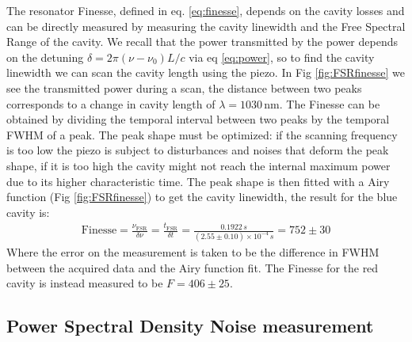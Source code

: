 The resonator Finesse, defined in eq. \ref{eq:finesse}, depends on the cavity losses and can be directly measured by measuring the cavity linewidth and the Free Spectral Range of the cavity. We recall that the power transmitted by the power depends on the detuning $\delta = 2\pi (\nu-\nu_0)L/c$ via eq \ref{eq:power}, so to find the cavity linewidth we can scan the cavity length using the piezo. In Fig \ref{fig:FSRfinesse} we see the transmitted power during a scan, the distance between two peaks corresponds to a change in cavity length of $\lambda = 1030$\,nm. The Finesse can be obtained by dividing the temporal interval between two peaks by the temporal FWHM of a peak. The peak shape must be optimized: if the scanning frequency is too low the piezo is subject to disturbances and noises that deform the peak shape, if it is too high the cavity might not reach the internal maximum power due to its higher characteristic time. The peak shape is then fitted with a Airy function (Fig \ref{fig:FSRfinesse}) to get the cavity linewidth, the result for the blue cavity is:
\begin{align}
	\mathrm{Finesse} = \frac{\nu_{\mathrm{FSR}}}{\delta\nu} =\frac{t_{\mathrm{FSR}}}{\delta t} = \frac{0.1922\,s}{(2.55\pm 0.10)\times 10^{-4}\,s} = 752 \pm 30
\end{align}
Where the error on the measurement is taken to be the difference in FWHM between the acquired data and the Airy function fit. 
The Finesse for the red cavity is instead measured to be $F = 406\pm25$.
\subsection{Power Spectral Density Noise measurement}

